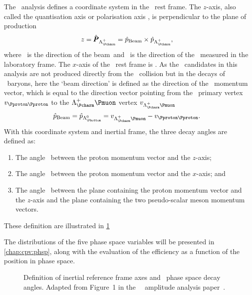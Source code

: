 The \esno\ analysis defines a coordinate system in the \PLambdac\ rest frame.
The $z$-axis, also called the quantisation axis or polarisation axis \polzlcp, 
is perpendicular to the plane of production
\begin{equation}
  z = \polzlcp = \phatbeam \times \phatlcp,
\end{equation}
where \phatbeam\ is the direction of the beam\footnotemark\ and \phatlcp\ is 
the direction of the \PLambdac\ measured in the laboratory frame.
The $x$-axis of the \PLambdac\ rest frame is \phatlcp.
As the \PLambdac\ candidates in this analysis are not produced directly from 
the \pp\ collision but in the decays of \PLambdab\ baryons, here the `beam 
direction' is defined as the direction of the \PLambdab\ momentum vector, which 
is equal to the direction vector pointing from the \pp\ primary vertex 
$v_{\pp}$ to the $\PLambdac\Pmuon$ vertex $v_{\PLambdac\Pmuon}$
\begin{equation}
  \phatbeam = \phatlbz = v_{\PLambdac\Pmuon} - v_{\pp}.
\end{equation}
With this coordinate system and inertial frame, the three decay angles are 
defined as:
\begin{enumerate}
  \item The angle \thetap\ between the proton momentum vector and the $z$-axis;
  \item The angle \phip\ between the proton momentum vector and the $x$-axis; 
    and
  \item The angle \phihh\ between the plane containing the proton momentum 
    vector and the $z$-axis and the plane containing the two pseudo-scalar 
    meson momentum vectors.
\end{enumerate}
These definition are illustrated in \cref{fig:cpv:theory:phsp:angles}

The distributions of the five phase space variables will be presented in 
\cref{chap:cpv:phsp}, along with the evaluation of the efficiency as a function 
of the position in phase space.

\begin{figure}
  \begin{subfigure}{0.5\textwidth}
    \resizebox{\textwidth}{!}{%
      
    }
  \end{subfigure}
  \begin{subfigure}{0.5\textwidth}
    \resizebox{\textwidth}{!}{%
      
    }
  \end{subfigure}
  \caption{%
    Definition of inertial reference frame axes and \LcTophh\ phase space decay 
    angles.
    Adapted from Figure~1 in the \esno\ \LcTopKpi\ amplitude analysis 
    paper~\cite{Aitala:1999uq}.
  }
  \label{fig:cpv:theory:phsp:angles}
\end{figure}
